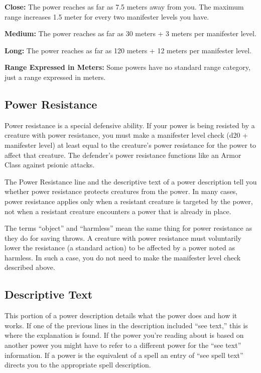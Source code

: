 \textbf{Close:} The power reaches as far as 7.5 meters away from you. The maximum range increases 1.5 meter for every two manifester levels you have.

\textbf{Medium:} The power reaches as far as 30 meters + 3 meters per manifester level.

\textbf{Long:} The power reaches as far as 120 meters + 12 meters per manifester level.

\textbf{Range Expressed in Meters:} Some powers have no standard range category, just a range expressed in meters.





\subsection{Power Resistance}
Power resistance is a special defensive ability. If your power is being resisted by a creature with power resistance, you must make a manifester level check (d20 + manifester level) at least equal to the creature's power resistance for the power to affect that creature. The defender's power resistance functions like an Armor Class against psionic attacks. %

The Power Resistance line and the descriptive text of a power description tell you whether power resistance protects creatures from the power. In many cases, power resistance applies only when a resistant creature is targeted by the power, not when a resistant creature encounters a power that is already in place.

The terms ``object'' and ``harmless'' mean the same thing for power resistance as they do for saving throws. A creature with power resistance must voluntarily lower the resistance (a standard action) to be affected by a power noted as harmless. In such a case, you do not need to make the manifester level check described above.



\subsection{Descriptive Text}
This portion of a power description details what the power does and how it works. If one of the previous lines in the description included ``see text,'' this is where the explanation is found. If the power you're reading about is based on another power you might have to refer to a different power for the ``see text'' information. If a power is the equivalent of a spell an entry of ``see spell text'' directs you to the appropriate spell description.


